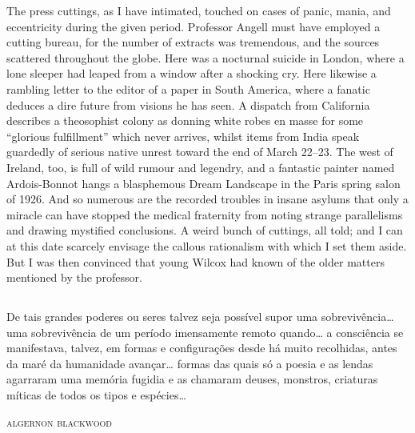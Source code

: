 \begin{pages}
\begin{Leftside}
The press cuttings, as I have intimated, touched on cases of panic,
mania, and eccentricity during the given period. Professor Angell must
have employed a cutting bureau, for the number of extracts was
tremendous, and the sources scattered throughout the globe. Here was a
nocturnal suicide in London, where a lone sleeper had leaped from a
window after a shocking cry. Here likewise a rambling letter to the
editor of a paper in South America, where a fanatic deduces a dire
future from visions he has seen. A dispatch from California describes a
theosophist colony as donning white robes en masse for some ``glorious
fulfillment'' which never arrives, whilst items from India speak
guardedly of serious native unrest toward the end of March 22--23.
The west of Ireland, too, is full of wild rumour and legendry, and a
fantastic painter named Ardois-Bonnot hangs a blasphemous Dream
Landscape in the Paris spring salon of 1926. And so numerous are the
recorded troubles in insane asylums that only a miracle can have stopped
the medical fraternity from noting strange parallelisms and drawing
mystified conclusions. A weird bunch of cuttings, all told; and I can at
this date scarcely envisage the callous rationalism with which I set
them aside. But I was then convinced that young Wilcox had known of the
older matters mentioned by the professor.

          \pend
         \endnumbering
    \end{Leftside}
    \begin{Rightside}
        \beginnumbering
            \pstart

\chapter*{}

\epigraph{De tais grandes poderes ou seres talvez seja possível supor uma
sobrevivência\ldots{} uma sobrevivência de um período imensamente remoto
quando\ldots{} a consciência se manifestava, talvez, em formas e
configurações desde há muito recolhidas, antes da maré da humanidade
avançar\ldots{} formas das quais só a poesia e as lendas agarraram uma
memória fugidia e as chamaram deuses, monstros, criaturas míticas de
todos os tipos e espécies\ldots{}}{\textsc{algernon blackwood}\endnotemark
}




\end{Rightside}
\end{pages}

